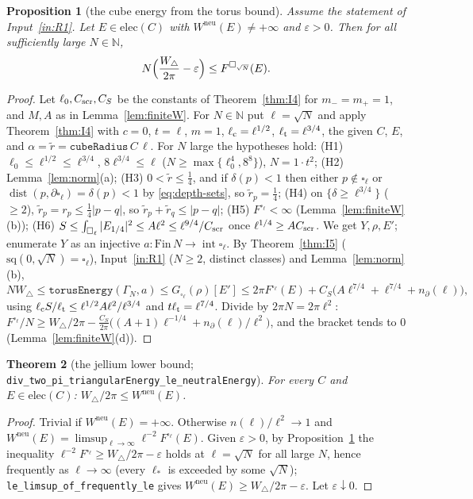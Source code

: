 \documentclass[11pt]{article}
\newtheorem{theorem}{Theorem}[section]
\newtheorem{proposition}[theorem]{Proposition}
\theoremstyle{definition}
\theoremstyle{remark}
\newcommand{\N}{\mathbb N}
\newcommand{\dep}{\delta}
\newcommand{\sq}{\mathrm{sq}}
\newcommand{\Wneu}{W^{\mathrm{neu}}}
\newcommand{\lc}{\ell_{\rm c}}
\newcommand{\lt}{\ell_{\rm t}}
\DeclareMathOperator{\dist}{dist}
\begin{document}
\begin{proposition}[the cube energy from the torus bound]\label{prop:I6}
Assume the statement of Input~\ref{in:R1}. Let $E\in\mathrm{elec}(C)$ with $\Wneu(E)\ne+\infty$ and $\varepsilon>0$. Then for all sufficiently large $N\in\N$,
\[
N\Bigl(\frac{W_\triangle}{2\pi}-\varepsilon\Bigr)\le F^{\square_{\sqrt N}}(E).
\]
\end{proposition}
\begin{proof}
Let $\ell_0,C_{\rm scr},C_S$ be the constants of Theorem~\ref{thm:I4} for $m_-=m_+=1$, and $M,A$ as in Lemma~\ref{lem:finiteW}. For $N\in\N$ put $\ell=\sqrt N$ and apply
Theorem~\ref{thm:I4} with $c=0$, $t=\ell$, $m=1$, $\lc=\ell^{1/2}$, $\lt=\ell^{3/4}$, the given $C$, $E$, and $\alpha=\tilde r=\texttt{cubeRadius}\,C\,\ell$. For $N$ large the
hypotheses hold: (H1) $\ell_0\le\ell^{1/2}\le\ell^{3/4}$, $8\ell^{3/4}\le\ell$ ($N\ge\max\{\ell_0^4,8^8\}$), $N=1\cdot t^2$; (H2) Lemma~\ref{lem:norm}(a);
(H3) $0<\tilde r\le\frac14$, and if $\dep(p)<1$ then either $p\notin\square_\ell$ or $\dist(p,\partial\square_\ell)=\dep(p)<1$ by \eqref{eq:depth-sets}, so $\tilde r_p=\frac14$;
(H4) on $\{\dep\ge\ell^{3/4}\}$ ($\ge2$), $\tilde r_p=r_p\le\frac14|p-q|$, so $\tilde r_p+\tilde r_q\le|p-q|$; (H5) $F^{\square_\ell}<\infty$ (Lemma~\ref{lem:finiteW}(b));
(H6) $S\le\int_{\square_\ell}|E_{1/4}|^2\le A\ell^2\le\ell^{9/4}/C_{\rm scr}$ once $\ell^{1/4}\ge AC_{\rm scr}$. We get $Y,\rho,E'$; enumerate $Y$ as an injective
$a:\mathrm{Fin}\,N\to\operatorname{int}\square_\ell$. By Theorem~\ref{thm:I5} ($\sq(0,\sqrt N)=\square_\ell$), Input~\ref{in:R1} ($N\ge2$, distinct classes) and
Lemma~\ref{lem:norm}(b),
\[
NW_\triangle\le\texttt{torusEnergy}(\Gamma_N,a)\le G_{\square_\ell}(\rho)[E']\le2\pi F^{\square_\ell}(E)+C_S\bigl(A\ell^{7/4}+\ell^{7/4}+n_\partial(\ell)\bigr),
\]
using $\lc S/\lt\le\ell^{1/2}A\ell^2/\ell^{3/4}$ and $t\lt=\ell^{7/4}$. Divide by $2\pi N=2\pi\ell^2$: $F^{\square_\ell}/N\ge W_\triangle/2\pi-\frac{C_S}{2\pi}\bigl((A+1)\ell^{-1/4}+n_\partial(\ell)/\ell^2\bigr)$,
and the bracket tends to $0$ (Lemma~\ref{lem:finiteW}(d)). 
\end{proof}

\begin{theorem}[the jellium lower bound; \texttt{div\_two\_pi\_triangularEnergy\_le\_neutralEnergy}]\label{thm:R2}
For every $C$ and $E\in\mathrm{elec}(C)$: $W_\triangle/2\pi\le\Wneu(E)$.
\end{theorem}
\begin{proof}
Trivial if $\Wneu(E)=+\infty$. Otherwise $n(\ell)/\ell^2\to1$ and $\Wneu(E)=\limsup_{\ell\to\infty}\ell^{-2}F^{\square_\ell}(E)$. Given $\varepsilon>0$, by
Proposition~\ref{prop:I6} the inequality $\ell^{-2}F^{\square_\ell}\ge W_\triangle/2\pi-\varepsilon$ holds at $\ell=\sqrt N$ for all large $N$, hence frequently as $\ell\to\infty$
(every $\ell_*$ is exceeded by some $\sqrt N$); \texttt{le\_limsup\_of\_frequently\_le} gives $\Wneu(E)\ge W_\triangle/2\pi-\varepsilon$. Let $\varepsilon\downarrow0$.
\end{proof}
\end{document}
